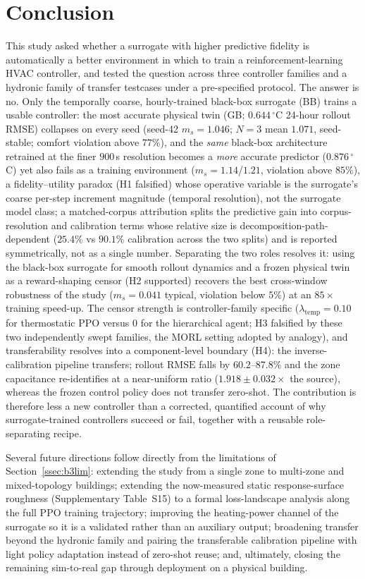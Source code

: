 \documentclass[a4paper,fleqn]{cas-sc}
\newcommand{\RMSE}{\ensuremath{\mathrm{RMSE}}}
\newcommand{\suppref}[1]{#1}
\begin{document}
\section{Conclusion}\label{sec:conclusion}
This study asked whether a surrogate with higher predictive fidelity is automatically a
better environment in which to train a reinforcement-learning HVAC controller, and
tested the question across three controller families and a hydronic family of
transfer testcases under a pre-specified protocol. The answer is
no. Only the temporally coarse, hourly-trained black-box surrogate (BB) trains a
usable controller: the most accurate physical twin (GB; $0.644\,^{\circ}$C 24-hour
rollout \RMSE) collapses on every seed (seed-42 $m_s = 1.046$; $N=3$ mean $1.071$, seed-stable; comfort violation above $77\%$), and the
\emph{same} black-box architecture retrained at the finer $900$\,s resolution becomes
a \emph{more} accurate predictor ($0.876\,^{\circ}$C) yet also fails as a training
environment ($m_s = 1.14$/$1.21$, violation above $85\%$), a fidelity--utility
paradox (H1 falsified) whose operative variable is the surrogate's coarse per-step
increment magnitude (temporal resolution), not the surrogate model class; a matched-corpus
attribution splits the predictive gain into corpus-resolution and calibration terms whose
relative size is decomposition-path-dependent ($25.4\%$ vs $90.1\%$ calibration across the two splits) and is reported symmetrically, not as a single number. Separating the two roles resolves it: using the
black-box surrogate for smooth rollout dynamics and a frozen physical twin as a
reward-shaping censor (H2 supported) recovers the best cross-window robustness of the
study ($m_s = 0.041$ typical, violation below $5\%$) at an $85\times$ training
speed-up. The censor strength is controller-family specific
($\lambda_{\mathrm{temp}}=0.10$ for thermostatic PPO versus $0$ for the hierarchical
agent; H3 falsified by these two independently swept families, the MORL setting adopted by analogy), and transferability resolves into a component-level
boundary (H4): the inverse-calibration pipeline transfers; rollout \RMSE{} falls
by $60.2$--$87.8\%$ and the zone capacitance re-identifies at a near-uniform
ratio ($1.918\pm0.032\times$ the source), whereas the frozen control policy
does not transfer zero-shot. The contribution is therefore less a new controller
than a corrected, quantified account of why surrogate-trained controllers succeed
or fail, together with a reusable role-separating recipe.

Several future directions follow directly from the limitations of
Section~\ref{ssec:b3lim}: extending the study from a single zone to multi-zone and
mixed-topology buildings; extending the now-measured static response-surface
roughness (Supplementary Table~\suppref{S15}) to a formal loss-landscape analysis
along the full PPO training trajectory;
improving the heating-power channel of the surrogate so it is a validated rather
than an auxiliary output; broadening transfer beyond the hydronic family and
pairing the transferable calibration pipeline with light policy adaptation instead
of zero-shot reuse; and, ultimately, closing the remaining sim-to-real gap through
deployment on a physical building.
\end{document}
